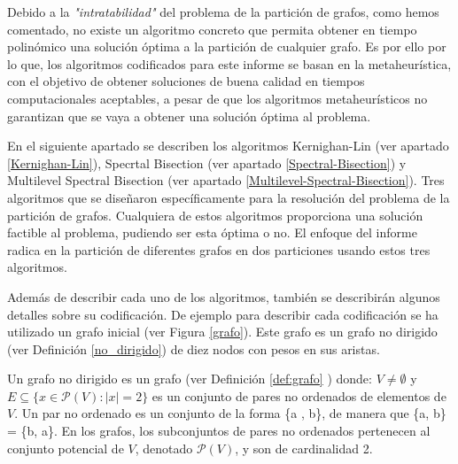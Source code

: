 Debido a la \textit{"intratabilidad"} del problema de la partición de grafos, como hemos comentado, no existe un algoritmo concreto que permita obtener en tiempo polinómico una solución óptima a la partición de cualquier grafo. Es por ello por lo que, los algoritmos codificados para este informe se basan en la metaheurística, con el objetivo de obtener soluciones de buena calidad en tiempos computacionales aceptables, a pesar de que los algoritmos metaheurísticos no garantizan que se vaya a obtener una solución óptima al problema.

En el siguiente apartado se describen los algoritmos Kernighan-Lin\cite{KernighanLin} (ver apartado \ref{Kernighan-Lin}), Specrtal Bisection (ver apartado \ref{Spectral-Bisection}) y Multilevel Spectral Bisection (ver apartado \ref{Multilevel-Spectral-Bisection}). Tres algoritmos que se diseñaron específicamente para la resolución del problema de la partición de grafos. Cualquiera de estos algoritmos proporciona una solución factible al problema, pudiendo ser esta óptima o no. El enfoque del informe radica en la partición de diferentes grafos en dos particiones usando estos tres algoritmos. 

Además de describir cada uno de los algoritmos, también se describirán algunos detalles sobre su codificación.
De ejemplo para describir cada codificación se ha utilizado un grafo inicial (ver Figura \ref{grafo}). Este grafo es un grafo no dirigido (ver Definición \ref{no_dirigido}) de diez nodos con pesos en sus aristas.

\begin{mydef}\label{no_dirigido}
	Un grafo no dirigido es un grafo (ver Definición \ref{def:grafo} ) donde: $V\neq \emptyset$ y $E\subseteq \{x\in \mathcal P(V):|x|=2\}$ es un conjunto de pares no ordenados de elementos de $V$. Un par no ordenado es un conjunto de la forma \{a , b\}, de manera que \{a, b\} = \{b, a\}. En los grafos, los subconjuntos de pares no ordenados pertenecen al conjunto potencial de $V$, denotado $\mathcal P(V)$, y son de cardinalidad 2. 
\end{mydef}

